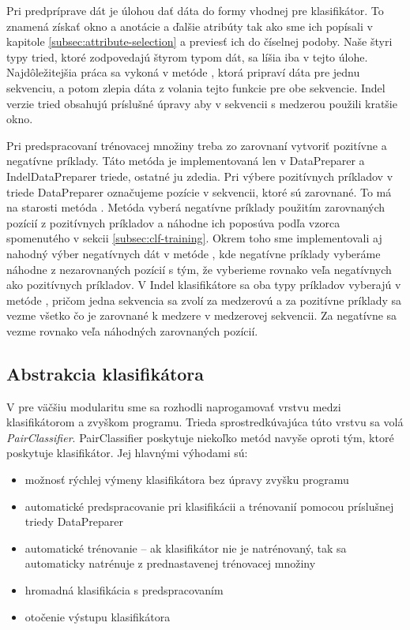 Pri predpríprave dát je úlohou dať dáta do formy vhodnej pre klasifikátor. To znamená získať okno a anotácie a ďalšie atribúty tak ako sme ich popísali v kapitole \ref{subsec:attribute-selection} a previesť ich do číselnej podoby. Naše štyri typy tried, ktoré zodpovedajú štyrom typom dát, sa líšia iba v tejto úlohe. Najdôležitejšia práca sa vykoná v metóde , ktorá pripraví dáta pre jednu sekvenciu, a potom zlepia dáta z volania tejto funkcie pre obe sekvencie. Indel verzie tried obsahujú príslušné úpravy aby v sekvencii s medzerou použili kratšie okno.

Pri predspracovaní trénovacej množiny treba zo zarovnaní vytvoriť pozitívne a negatívne príklady. Táto metóda je implementovaná len v DataPreparer a IndelDataPreparer triede, ostatné ju zdedia. Pri výbere pozitívnych príkladov v triede DataPreparer označujeme pozície v sekvencii, ktoré sú zarovnané. To má na starosti metóda . Metóda  vyberá negatívne príklady použitím zarovnaných pozícií z pozitívnych príkladov a náhodne ich poposúva podľa vzorca spomenutého v sekcii \ref{subsec:clf-training}. Okrem toho sme implementovali aj nahodný výber negatívnych dát v metóde , kde negatívne príklady vyberáme náhodne z nezarovnaných pozícií s tým, že vyberieme rovnako veľa negatívnych ako pozitívnych príkladov. V Indel klasifikátore sa oba typy príkladov vyberajú v metóde , pričom jedna sekvencia sa zvolí za medzerovú a za pozitívne príklady sa vezme všetko čo je zarovnané k medzere v medzerovej sekvencii. Za negatívne sa vezme rovnako veľa náhodných zarovnaných pozícií.

\subsection{Abstrakcia klasifikátora}
\label{subsec:pairclassifier}
V pre väčšiu modularitu sme sa rozhodli naprogamovať vrstvu medzi klasifikátorom a zvyškom programu. Trieda sprostredkúvajúca túto vrstvu sa volá \textit{PairClassifier}. PairClassifier poskytuje niekoľko metód navyše oproti tým, ktoré poskytuje klasifikátor.
Jej hlavnými výhodami sú:

\begin{itemize}
    \item možnosť rýchlej výmeny klasifikátora bez úpravy zvyšku programu
    \item automatické predspracovanie pri klasifikácii a trénovanií pomocou príslušnej triedy DataPreparer
    \item automatické trénovanie -- ak klasifikátor nie je natrénovaný, tak sa automaticky natrénuje z prednastavenej trénovacej množiny
    \item hromadná klasifikácia s predspracovaním
    \item otočenie výstupu klasifikátora
\end{itemize}

